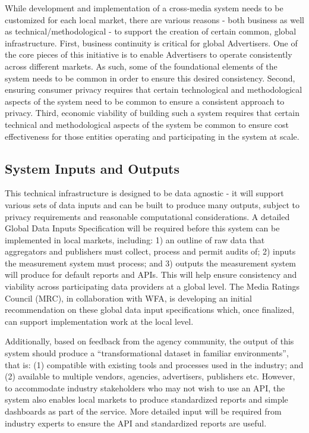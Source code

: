 \documentclass[]{article}
\begin{document}
While development and implementation of a cross-media system needs to be customized for each local market, there are various reasons - both business as well as technical/methodological - to support the creation of certain common, global infrastructure. First, business continuity is critical for global Advertisers. One of the core pieces of this initiative is to enable Advertisers to operate consistently across different markets. As such, some of the foundational elements of the system needs to be common in order to ensure this desired consistency. Second, ensuring consumer privacy requires that certain technological and methodological aspects of the system need to be common to ensure a
consistent approach to privacy. Third, economic viability of building such a system requires that certain technical and methodological aspects of the system be common to ensure cost effectiveness for those entities operating and participating in the system at scale.


\subsection{System Inputs and Outputs}

This technical infrastructure is designed to be data agnostic - it will support various sets of data inputs and can be built to produce many outputs, subject to privacy requirements and reasonable computational considerations. A detailed Global Data Inputs Specification will be required before this system can be implemented in local markets, including: 1) an outline of raw data that aggregators and publishers must collect, process and permit audits of; 2) inputs the measurement system must process; and 3) outputs the measurement system will produce for default reports and APIs. This will help ensure consistency and viability across participating data providers at a global level. The Media Ratings Council (MRC), in collaboration with WFA, is developing an initial recommendation on these global data input specifications which, once finalized, can support implementation work at the local level.

Additionally, based on feedback from the agency community, the output of this system should produce a ``transformational dataset in familiar environments'', that is: (1) compatible with existing tools and processes used in the industry; and (2) available to multiple vendors, agencies, advertisers, publishers etc. However, to accommodate industry stakeholders who may not wish to use an API, the system also enables local markets to produce standardized reports and simple dashboards as part of the service. More detailed input will be required from industry experts to ensure the API and standardized reports are useful.
\end{document}
